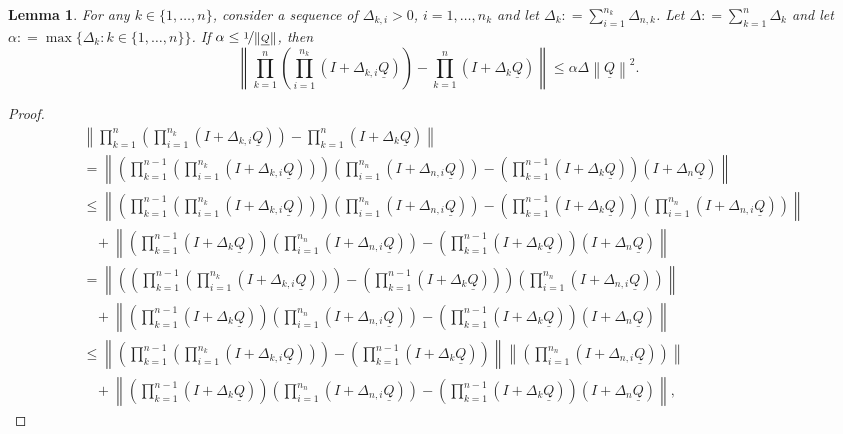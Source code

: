 \documentclass[10pt]{paper}
\newtheorem{lemma}[theorem]{Lemma}
\newcommand{\lrate}{\underline{Q}}
\newcommand{\norm}[1]{\left\lVert #1 \right\rVert}
\newcommand{\coloneqq}{:\!=}
\begin{document}
\begin{lemma}\label{lemma:differencebetweennested_appendix}
For any $k\in\{1,\dots,n\}$, consider a sequence of $\Delta_{k,i}>0$, $i=1,\dots,n_k$ and let $\Delta_k\coloneqq\sum_{i=1}^{n_k}\Delta_{n,k}$. Let $\Delta\coloneqq\sum_{k=1}^n\Delta_k$ and let $\alpha\coloneqq\max\{\Delta_k\colon k\in\{1,\dots,n\}\}$. If $\alpha\leq\nicefrac{1}{\norm{\lrate}}$, then
\begin{equation*}
\norm{\prod_{k=1}^n\left(\prod_{i=1}^{n_k}(I+\Delta_{k,i}\lrate)\right)
-
\prod_{k=1}^n(I+\Delta_k\lrate)
}
\leq\alpha\Delta\norm{\lrate}^2.
\end{equation*}
\end{lemma}
\begin{proof}
\begin{align*}
&\norm{\prod_{k=1}^n\left(\prod_{i=1}^{n_k}(I+\Delta_{k,i}\lrate)\right)
-
\prod_{k=1}^n(I+\Delta_k\lrate)
}\\
&=\norm{\left(\prod_{k=1}^{n-1}\left(\prod_{i=1}^{n_k}(I+\Delta_{k,i}\lrate)\right)\right)\left(\prod_{i=1}^{n_n}(I+\Delta_{n,i}\lrate)\right)
-
\left(\prod_{k=1}^{n-1}(I+\Delta_k\lrate)\right)(I+\Delta_n\lrate)
}\\
&\leq\norm{
\left(\prod_{k=1}^{n-1}\left(\prod_{i=1}^{n_k}(I+\Delta_{k,i}\lrate)\right)\right)\left(\prod_{i=1}^{n_n}(I+\Delta_{n,i}\lrate)\right)
-
\left(\prod_{k=1}^{n-1}(I+\Delta_k\lrate)\right)
\left(\prod_{i=1}^{n_n}(I+\Delta_{n,i}\lrate)\right)
}\\
&~~~~+\norm{
\left(\prod_{k=1}^{n-1}(I+\Delta_k\lrate)\right)
\left(\prod_{i=1}^{n_n}(I+\Delta_{n,i}\lrate)\right)
-
\left(\prod_{k=1}^{n-1}(I+\Delta_k\lrate)\right)(I+\Delta_n\lrate)
}\\
&=\norm{
\left(
\left(
\prod_{k=1}^{n-1}\left(\prod_{i=1}^{n_k}(I+\Delta_{k,i}\lrate)\right)
\right)
-
\left(\prod_{k=1}^{n-1}(I+\Delta_k\lrate)\right)
\right)
\left(\prod_{i=1}^{n_n}(I+\Delta_{n,i}\lrate)\right)
}\\
&~~~~+\norm{
\left(\prod_{k=1}^{n-1}(I+\Delta_k\lrate)\right)
\left(\prod_{i=1}^{n_n}(I+\Delta_{n,i}\lrate)\right)
-
\left(\prod_{k=1}^{n-1}(I+\Delta_k\lrate)\right)(I+\Delta_n\lrate)
}\\
&\leq\norm{
\left(
\prod_{k=1}^{n-1}\left(\prod_{i=1}^{n_k}(I+\Delta_{k,i}\lrate)\right)
\right)
-
\left(\prod_{k=1}^{n-1}(I+\Delta_k\lrate)\right)
}
\norm{
\left(\prod_{i=1}^{n_n}(I+\Delta_{n,i}\lrate)\right)
}\\
&~~~~+\norm{
\left(\prod_{k=1}^{n-1}(I+\Delta_k\lrate)\right)
\left(\prod_{i=1}^{n_n}(I+\Delta_{n,i}\lrate)\right)
-
\left(\prod_{k=1}^{n-1}(I+\Delta_k\lrate)\right)(I+\Delta_n\lrate)
},
\end{align*}


\end{proof}
\end{document}
